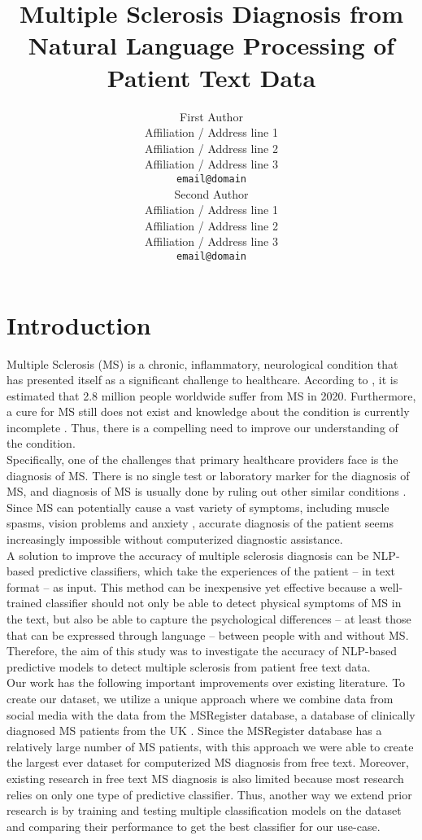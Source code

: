 \documentclass[11pt,a4paper]{article}
\title{Multiple Sclerosis Diagnosis from Natural Language Processing of Patient Text Data}
\author{First Author \\
  Affiliation / Address line 1 \\
  Affiliation / Address line 2 \\
  Affiliation / Address line 3 \\
  \texttt{email@domain} \\\And
  Second Author \\
  Affiliation / Address line 1 \\
  Affiliation / Address line 2 \\
  Affiliation / Address line 3 \\
  \texttt{email@domain} \\}
\date{}
\begin{document}
\maketitle
\begin{abstract}
\end{abstract}

\section{Introduction}
Multiple Sclerosis (MS) is a chronic, inflammatory, neurological condition that has presented itself as a significant challenge to healthcare. According to \citet{Walton:20}, it is estimated that 2.8 million people worldwide suffer from MS in 2020. Furthermore, a cure for MS still does not exist and knowledge about the condition is currently incomplete \citep{Bebo:22}. Thus, there is a compelling need to improve our understanding of the condition. \\
\indent Specifically, one of the challenges that primary healthcare providers face is the diagnosis of MS. There is no single test or laboratory marker for the diagnosis of MS, and diagnosis of MS is usually done by ruling out other similar conditions \citep{Omerhoca:18}. Since MS can potentially cause a vast variety of symptoms, including muscle spasms, vision problems and anxiety \citep{Ghasemi:17}, accurate diagnosis of the patient seems increasingly impossible without computerized diagnostic assistance. \\
\indent A solution to improve the accuracy of multiple sclerosis diagnosis can be NLP-based predictive classifiers, which take the experiences of the patient – in text format – as input. This method can be inexpensive yet effective because a well-trained classifier should not only be able to detect physical symptoms of MS in the text, but also be able to capture the psychological differences – at least those that can be expressed through language – between people with and without MS. Therefore, the aim of this study was to investigate the accuracy of NLP-based predictive models to detect multiple sclerosis from patient free text data. \\
\indent Our work has the following important improvements over existing literature. To create our dataset, we utilize a unique approach where we combine data from social media with the data from the MSRegister database, a database of clinically diagnosed MS patients from the UK \citep{Ford:12}. Since the MSRegister database has a relatively large number of MS patients, with this approach we were able to create the largest ever dataset for computerized MS diagnosis from free text. Moreover, existing research in free text MS diagnosis is also limited because most research relies on only one type of predictive classifier. Thus, another way we extend prior research is by training and testing multiple classification models on the dataset and comparing their performance to get the best classifier for our use-case. \\
\end{document}

